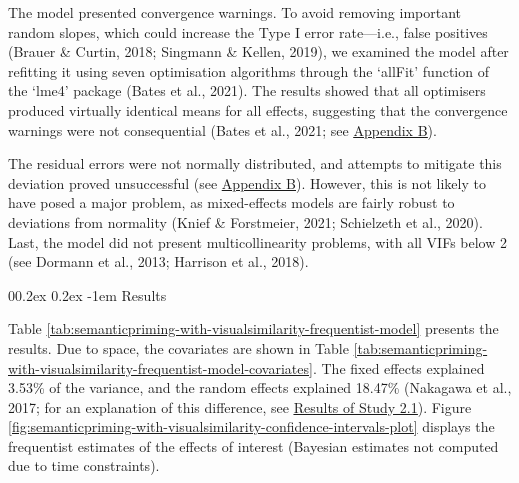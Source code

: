 \documentclass[
  12pt,
  man,floatsintext]{apa7}
\makeatletter
\let\oldparagraph\paragraph
\renewcommand{\paragraph}[1]{\oldparagraph{#1}\mbox{}}
\renewcommand{\paragraph}{\@startsection{paragraph}{4}{\parindent}%
  {0\baselineskip \@plus 0.2ex \@minus 0.2ex}%
  {-1em}%
  {\normalfont\normalsize\bfseries\itshape\typesectitle}}
\makeatother
\begin{document}
The model presented convergence warnings. To avoid removing important random slopes, which could increase the Type I error rate---i.e., false positives (Brauer \& Curtin, 2018; Singmann \& Kellen, 2019), we examined the model after refitting it using seven optimisation algorithms through the `allFit' function of the `lme4' package (Bates et al., 2021). The results showed that all optimisers produced virtually identical means for all effects, suggesting that the convergence warnings were not consequential (Bates et al., 2021; see \protect\hyperlink{appendix-B-frequentist-analysis-diagnostics}{\underline{Appendix B}}).

The residual errors were not normally distributed, and attempts to mitigate this deviation proved unsuccessful (see \protect\hyperlink{appendix-B-frequentist-analysis-diagnostics}{\underline{Appendix B}}). However, this is not likely to have posed a major problem, as mixed-effects models are fairly robust to deviations from normality (Knief \& Forstmeier, 2021; Schielzeth et al., 2020). Last, the model did not present multicollinearity problems, with all VIFs below 2 (see Dormann et al., 2013; Harrison et al., 2018).

\hypertarget{results-1}{%
\paragraph{Results}\label{results-1}}

Table \ref{tab:semanticpriming-with-visualsimilarity-frequentist-model} presents the results. Due to space, the covariates are shown in Table \ref{tab:semanticpriming-with-visualsimilarity-frequentist-model-covariates}. The fixed effects explained 3.53\% of the variance, and the random effects explained 18.47\% (Nakagawa et al., 2017; for an explanation of this difference, see \protect\hyperlink{semanticpriming-results}{\underline{Results of Study 2.1}}). Figure \ref{fig:semanticpriming-with-visualsimilarity-confidence-intervals-plot} displays the frequentist estimates of the effects of interest (Bayesian estimates not computed due to time constraints).
\end{document}
